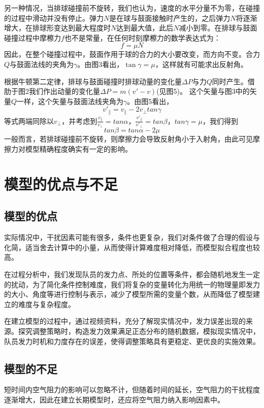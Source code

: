 \documentclass[withoutpreface,bwprint]{cumcmthesis} %
\begin{document}
另一种情况，当排球碰撞前不旋转，我们也认为，速度的水平分量不为零，在碰撞的过程中滑动并没有停止。弹力$N$是在球与鼓面接触时产生的，之后弹力$N$将逐渐增大，在排球形变达到最大程度时$N$达到最大值，此后$N$减小到零。在排球与鼓面碰撞过程中摩檫力$f$也不是常量，在任何时刻摩檫力的数学表达式为：
\begin{equation*}
	f=\mu N
\end{equation*}
因此，在整个碰撞过程中，鼓面作用于球的合力的大小要改变，而方向不变。合力$Q$与鼓面法线的夹角为$\gamma$。由图3看出，$\tan \gamma=\mu$，这样就有可能求出反射角。

根据牛顿第二定律，排球与鼓面碰撞时排球动量的变化量$\Delta P$与力$Q$同时产生。借肋于图2我们作出动量的变化量$\Delta P=m(v'-v)$(见图5)。
这个矢量与图3中的矢量$Q$一样，这个矢量与鼓面法线夹角为$\gamma$。由图5看出，
\begin{equation*}
	v'_\parallel=v_\parallel-2v_\bot tan\gamma
\end{equation*}
等式两端同除以$v_\bot$，并考虑到$\frac{v_\parallel}{v_\bot}=tan\alpha$，$\frac{v'_\parallel}{v'_\bot}=tan\beta$，$tan\gamma=\mu$，我们得到
\begin{equation*}
	tan\beta=tan\alpha-2\mu
\end{equation*}
一般而言，若排球碰撞前不旋转，则摩擦力会导致反射角小于入射角，由此可见摩擦力对模型精确程度确实有一定的影响。
\section{模型的优点与不足}
\subsection{模型的优点}
实际情况中，干扰因素可能有很多，条件也更复杂，我们对条件做了合理的假设与化简，适当舍去计算中的小量，从而使得计算难度相对降低，而模型拟合程度也较高。

在过程分析中，我们发现队员的发力点、所处的位置等条件，都会随机地发生一定的扰动，为了简化条件控制难度，我们将复杂的变量转化为用统一的物理量即发力的大小、角度等进行控制与表示，减少了模型所需的变量个数，从而降低了模型建立的难度与复杂程度。

在建立模型的过程中，通过视频资料，充分了解现实情况中，发力误差出现的来源。探究调整策略时，构造发力效果满足正态分布的随机数据，模拟现实情况中，队员发力时机和力度存在的误差，使得调整策略具有更稳定、更优良的实施效果。
\subsection{模型的不足}
短时间内空气阻力的影响可以忽略不计，但随着时间的延长，空气阻力的干扰程度逐渐增大，因此在建立长期模型时，还应将空气阻力纳入影响因素中。
\newpage
\end{document}

